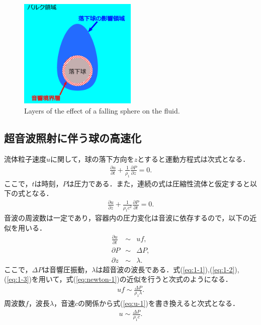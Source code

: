 \begin{figure}[ht]
    \centering
    \includegraphics[width=0.5\textwidth]{4-Theory/boundary_layer.eps}
    \caption{Layers of the effect of a falling sphere on the fluid.}
    \label{fig:layer}
\end{figure}

\subsection{超音波照射に伴う球の高速化}
\label{sec:UTdiff}
流体粒子速度$u$に関して，球の落下方向を$z$とすると運動方程式は次式となる．
\begin{eqnarray}
    \frac{\partial u}{\partial t} + \frac{1}{\rho_1}\frac{\partial P}{\partial z} = 0 .
    \label{eq:newton-1}
\end{eqnarray}
ここで，$t$は時刻，$P$は圧力である．また，連続の式は圧縮性流体と仮定すると以下の式となる．
\begin{eqnarray}
    \frac{\partial u}{\partial z} + \frac{1}{\rho_1 c^2}\frac{\partial P}{\partial t} = 0 .
\end{eqnarray}
音波の周波数は一定であり，容器内の圧力変化は音波に依存するので，以下の近似を用いる．
\begin{eqnarray}
    \frac{\partial u}{\partial t} &\sim& uf ,\label{eq:1-1}\\
    \partial P &\sim& \Delta P ,\label{eq:1-2}\\
    \partial z &\sim& \lambda .\label{eq:1-3}
\end{eqnarray}
ここで，$\Delta P$は音響圧振動，$\lambda$は超音波の波長である．式(\ref{eq:1-1}),(\ref{eq:1-2}),(\ref{eq:1-3})を用いて，式(\ref{eq:newton-1})の近似を行うと次式のようになる．
\begin{eqnarray}
    uf \sim \frac{\Delta P}{\rho_1 \lambda} .
    \label{eq:u-1}
\end{eqnarray}
周波数$f$，波長$\lambda$，音速$c$の関係から式(\ref{eq:u-1})を書き換えると次式となる．
\begin{eqnarray}
    u \sim \frac{\Delta P}{\rho_1 c} .
\end{eqnarray}

